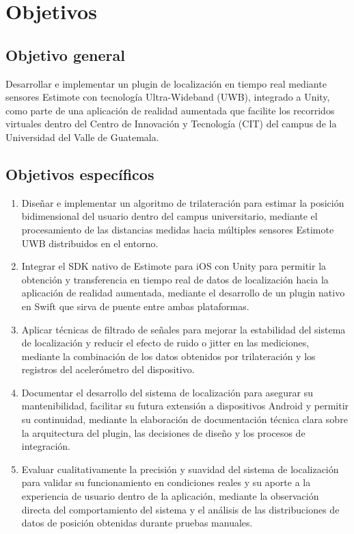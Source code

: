 \section{Objetivos}
\subsection{Objetivo general}
{\justify Desarrollar e implementar un plugin de localización en tiempo real mediante sensores Estimote con tecnología Ultra-Wideband (UWB), integrado a Unity, como parte de una aplicación de realidad aumentada que facilite los recorridos virtuales dentro del Centro de Innovación y Tecnología (CIT) del campus de la Universidad del Valle de Guatemala.}

\subsection{Objetivos específicos}
\begin{enumerate}[label=\thesubsection.\arabic*]
    \item Diseñar e implementar un algoritmo de trilateración
para estimar la posición bidimensional del usuario dentro del campus universitario,
mediante el procesamiento de las distancias medidas hacia múltiples sensores Estimote UWB distribuidos en el entorno.
    \item Integrar el SDK nativo de Estimote para iOS con Unity
para permitir la obtención y transferencia en tiempo real de datos de localización hacia la aplicación de realidad aumentada,
mediante el desarrollo de un plugin nativo en Swift que sirva de puente entre ambas plataformas.
    \item Aplicar técnicas de filtrado de señales
para mejorar la estabilidad del sistema de localización y reducir el efecto de ruido o jitter en las mediciones,
mediante la combinación de los datos obtenidos por trilateración y los registros del acelerómetro del dispositivo.
    \item Documentar el desarrollo del sistema de localización
para asegurar su mantenibilidad, facilitar su futura extensión a dispositivos Android y permitir su continuidad,
mediante la elaboración de documentación técnica clara sobre la arquitectura del plugin, las decisiones de diseño y los procesos de integración.
    \item Evaluar cualitativamente la precisión y suavidad del sistema de localización
para validar su funcionamiento en condiciones reales y su aporte a la experiencia de usuario dentro de la aplicación,
mediante la observación directa del comportamiento del sistema y el análisis de las distribuciones de datos de posición obtenidas durante pruebas manuales.       
\end{enumerate}

\newpage